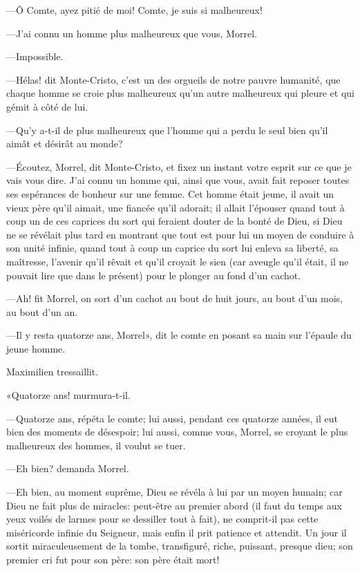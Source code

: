 —Ô Comte, ayez pitié de moi! Comte, je suis si malheureux! 

—J'ai connu un homme plus malheureux que vous, Morrel. 

—Impossible. 

—Hélas! dit Monte-Cristo, c'est un des orgueils de notre pauvre humanité, que chaque homme se croie plus malheureux qu'un autre malheureux qui pleure et qui gémit à côté de lui. 

—Qu'y a-t-il de plus malheureux que l'homme qui a perdu le seul bien qu'il aimât et désirât au monde? 

—Écoutez, Morrel, dit Monte-Cristo, et fixez un instant votre esprit sur ce que je vais vous dire. J'ai connu un homme qui, ainsi que vous, avait fait reposer toutes ses espérances de bonheur sur une femme. Cet homme était jeune, il avait un vieux père qu'il aimait, une fiancée qu'il adorait; il allait l'épouser quand tout à coup un de ces caprices du sort qui feraient douter de la bonté de Dieu, si Dieu ne se révélait plus tard en montrant que tout est pour lui un moyen de conduire à son unité infinie, quand tout à coup un caprice du sort lui enleva sa liberté, sa maîtresse, l'avenir qu'il rêvait et qu'il croyait le sien (car aveugle qu'il était, il ne pouvait lire que dans le présent) pour le plonger au fond d'un cachot. 

—Ah! fit Morrel, on sort d'un cachot au bout de huit jours, au bout d'un mois, au bout d'un an. 

—Il y resta quatorze ans, Morrel», dit le comte en posant sa main sur l'épaule du jeune homme. 

Maximilien tressaillit. 

«Quatorze ans! murmura-t-il. 

—Quatorze ans, répéta le comte; lui aussi, pendant ces quatorze années, il eut bien des moments de désespoir; lui aussi, comme vous, Morrel, se croyant le plus malheureux des hommes, il voulut se tuer. 

—Eh bien? demanda Morrel. 

—Eh bien, au moment suprême, Dieu se révéla à lui par un moyen humain; car Dieu ne fait plus de miracles: peut-être au premier abord (il faut du temps aux yeux voilés de larmes pour se dessiller tout à fait), ne comprit-il pas cette miséricorde infinie du Seigneur, mais enfin il prit patience et attendit. Un jour il sortit miraculeusement de la tombe, transfiguré, riche, puissant, presque dieu; son premier cri fut pour son père: son père était mort! 

